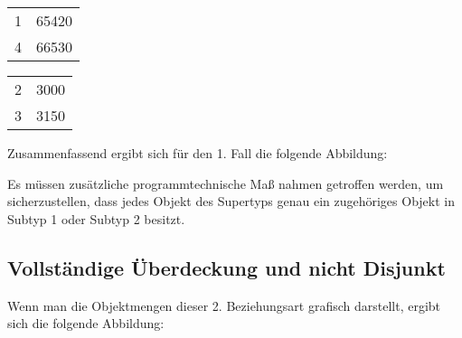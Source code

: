 \begin{supertabular}[h]{lp{5cm}}
    1 & 65420\\
    4 & 66530\\
\end{supertabular}


\begin{supertabular}[h]{lp{5cm}}
    2 & 3000\\
    3 & 3150\\
\end{supertabular}

Zusammenfassend ergibt sich für den 1. Fall die folgende Abbildung:

\begin{center}
\end{center}
\vspace{\baselineskip}
\begin{center}
\end{center}

\begin{merke}
    Es müssen zusätzliche programmtechnische Maß nahmen getroffen werden, um sicherzustellen, dass jedes Objekt des Supertyps genau ein zugehöriges Objekt in Subtyp 1 oder Subtyp 2 besitzt.
\end{merke}
\subsection{Vollständige Überdeckung und nicht Disjunkt}
Wenn man die Objektmengen dieser 2. Beziehungsart grafisch darstellt, ergibt sich die folgende Abbildung:

